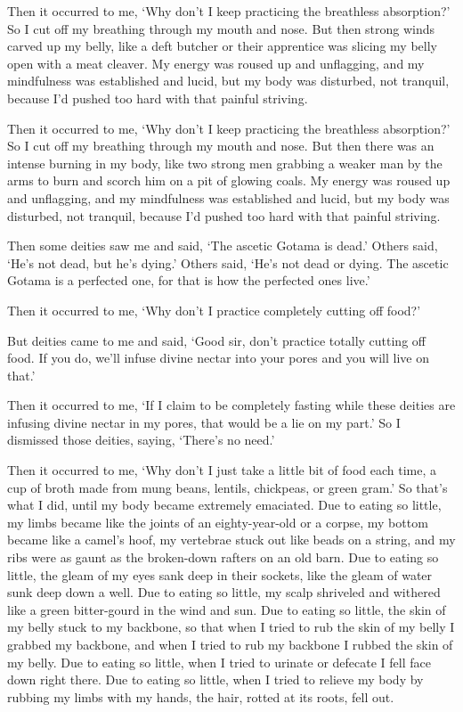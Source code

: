 \documentclass[12pt,openany]{book}%
\begin{document}
Then it occurred to me, ‘Why don’t I keep practicing the breathless absorption?’ So I cut off my breathing through my mouth and nose. But then strong winds carved up my belly, like a deft butcher or their apprentice was slicing my belly open with a meat cleaver. My energy was roused up and unflagging, and my mindfulness was established and lucid, but my body was disturbed, not tranquil, because I’d pushed too hard with that painful striving. 

Then it occurred to me, ‘Why don’t I keep practicing the breathless absorption?’ So I cut off my breathing through my mouth and nose. But then there was an intense burning in my body, like two strong men grabbing a weaker man by the arms to burn and scorch him on a pit of glowing coals. My energy was roused up and unflagging, and my mindfulness was established and lucid, but my body was disturbed, not tranquil, because I’d pushed too hard with that painful striving. 

Then some deities saw me and said, ‘The ascetic Gotama is dead.’ Others said, ‘He’s not dead, but he’s dying.’ Others said, ‘He’s not dead or dying. The ascetic Gotama is a perfected one, for that is how the perfected ones live.’ 

Then it occurred to me, ‘Why don’t I practice completely cutting off food?’ 

But deities came to me and said, ‘Good sir, don’t practice totally cutting off food. If you do, we’ll infuse divine nectar into your pores and you will live on that.’ 

Then it occurred to me, ‘If I claim to be completely fasting while these deities are infusing divine nectar in my pores, that would be a lie on my part.’ So I dismissed those deities, saying, ‘There’s no need.’ 

Then it occurred to me, ‘Why don’t I just take a little bit of food each time, a cup of broth made from mung beans, lentils, chickpeas, or green gram.’ So that’s what I did, until my body became extremely emaciated. Due to eating so little, my limbs became like the joints of an eighty-year-old or a corpse, my bottom became like a camel’s hoof, my vertebrae stuck out like beads on a string, and my ribs were as gaunt as the broken-down rafters on an old barn. Due to eating so little, the gleam of my eyes sank deep in their sockets, like the gleam of water sunk deep down a well. Due to eating so little, my scalp shriveled and withered like a green bitter-gourd in the wind and sun. Due to eating so little, the skin of my belly stuck to my backbone, so that when I tried to rub the skin of my belly I grabbed my backbone, and when I tried to rub my backbone I rubbed the skin of my belly. Due to eating so little, when I tried to urinate or defecate I fell face down right there. Due to eating so little, when I tried to relieve my body by rubbing my limbs with my hands, the hair, rotted at its roots, fell out. 
\end{document}
